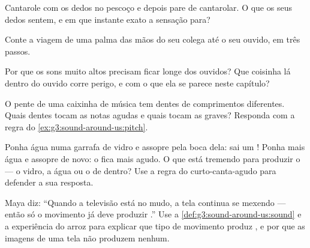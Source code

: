 \begin{exercise}[$\star$]\label{exo:g3:sound-around-us:6}
Cantarole com os dedos no pescoço e depois pare de cantarolar. O que
os seus dedos sentem, e em que instante exato a sensação para?
\end{exercise}

\begin{exercise}[$\star$]\label{exo:g3:sound-around-us:7}
Conte a viagem de uma palma das mãos do seu colega até o seu ouvido,
em três passos.
\end{exercise}

\begin{exercise}[$\star$]\label{exo:g3:sound-around-us:8}
Por que os sons muito altos precisam ficar longe dos ouvidos? Que
coisinha lá dentro do ouvido corre perigo, e com o que ela se parece
neste capítulo?
\end{exercise}

\begin{exercise}[$\star$]\label{exo:g3:sound-around-us:9}
O pente de uma caixinha de música tem dentes de comprimentos
diferentes. Quais dentes tocam as notas agudas e quais tocam as
graves? Responda com a regra do \cref{ex:g3:sound-around-us:pitch}.
\end{exercise}

\begin{exercise}[$\star\star$]\label{exo:g3:sound-around-us:10}
Ponha água numa garrafa de vidro e assopre pela boca dela: sai um
! Ponha mais água e assopre de novo: o  fica mais agudo. O que
está tremendo para produzir o  --- o vidro, a água ou o  de
dentro? Use a regra do curto-canta-agudo para defender a sua
resposta.
\end{exercise}

\begin{exercise}[$\star\star$]\label{exo:g3:sound-around-us:11}
Maya diz: ``Quando a televisão está no mudo, a tela continua se
mexendo --- então só o movimento já deve produzir .'' Use a
\cref{def:g3:sound-around-us:sound} e a experiência do arroz para
explicar que tipo de movimento produz , e por que as imagens de
uma tela não produzem nenhum.
\end{exercise}
